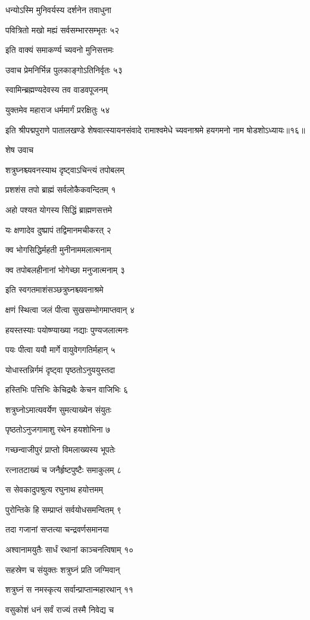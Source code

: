 धन्योऽस्मि मुनिवर्यस्य दर्शनेन तवाधुना

पवित्रितो मखो मह्यं सर्वसम्भारसम्भृतः ५२

इति वाक्यं समाकर्ण्य च्यवनो मुनिसत्तमः

उवाच प्रेमनिर्भिन्न पुलकाङ्गोऽतिनिर्वृतः ५३

स्वामिन्ब्रह्मण्यदेवस्य तव वाडवपूजनम्

युक्तमेव महाराज धर्ममार्गं प्ररक्षितुः ५४

इति श्रीपद्मपुराणे पातालखण्डे शेषवात्स्यायनसंवादे रामाश्वमेधे च्यवनाश्रमे हयगमनो नाम षोडशोऽध्यायः॥१६॥


शेष उवाच

शत्रुघ्नश्च्यवनस्याथ दृष्ट्वाऽचिन्त्यं तपोबलम्

प्रशशंस तपो ब्राह्मं सर्वलोकैकवन्दितम् १

अहो पश्यत योगस्य सिद्धिं ब्राह्मणसत्तमे

यः क्षणादेव दुष्प्रापं तद्विमानमचीकरत् २

क्व भोगसिद्धिर्महती मुनीनाममलात्मनाम्

क्व तपोबलहीनानां भोगेच्छा मनुजात्मनाम् ३

इति स्वगतमाशंसञ्छत्रुघ्नश्च्यवनाश्रमे

क्षणं स्थित्वा जलं पीत्वा सुखसम्भोगमाप्तवान् ४

हयस्तस्याः पयोष्ण्याख्या नद्याः पुण्यजलात्मनः

पयः पीत्वा ययौ मार्गे वायुवेगगतिर्महान् ५

योधास्तन्निर्गमं दृष्ट्वा पृष्ठतोऽनुययुस्तदा

हस्तिभिः पत्तिभिः केचिद्रथैः केचन वाजिभिः ६

शत्रुघ्नोऽमात्यवर्येण सुमत्याख्येन संयुतः

पृष्ठतोऽनुजगामाशु रथेन हयशोभिना ७

गच्छन्वाजीपुरं प्राप्तो विमलाख्यस्य भूपतेः

रत्नातटाख्यं च जनैर्हृष्टपुष्टैः समाकुलम् ८

स सेवकादुपश्रुत्य रघुनाथ हयोत्तमम्

पुरोन्तिके हि सम्प्राप्तं सर्वयोधसमन्वितम् ९

तदा गजानां सप्तत्या चन्द्रवर्णसमानया

अश्वानामयुतैः सार्धं रथानां काञ्चनत्विषाम् १०

सहस्रेण च संयुक्तः शत्रुघ्नं प्रति जग्मिवान्

शत्रुघ्नं स नमस्कृत्य सर्वान्प्राप्तान्महारथान् ११

वसुकोशं धनं सर्वं राज्यं तस्मै निवेद्य च

